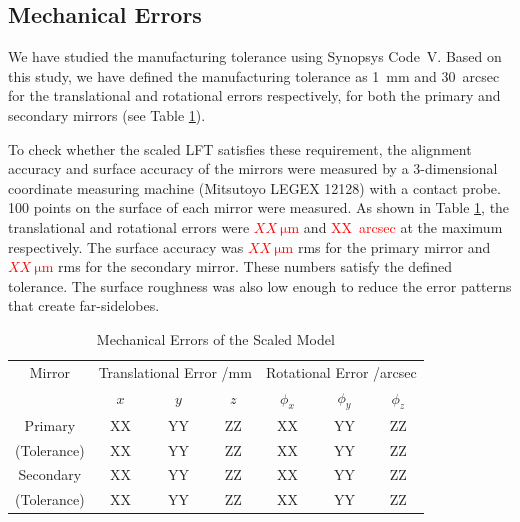 \documentclass[journal]{IEEEtran}
\newcommand{\red}[1]{\textcolor{red}{#1}}
\begin{document}
%
%
\subsection{Mechanical Errors}
%
We have studied the manufacturing tolerance using Synopsys Code~V. 
Based on this study, we have defined the manufacturing tolerance as 1~mm and 30~arcsec for the translational and rotational errors respectively, for both the primary and secondary mirrors (see Table \ref{tb:mech_err}).
\par
To check whether the scaled LFT satisfies these requirement, the alignment accuracy and surface accuracy of the mirrors were measured by a 3-dimensional coordinate measuring machine (Mitsutoyo LEGEX 12128) with a contact probe. 100 points on the surface of each mirror were measured. 
As shown in Table \ref{tb:mech_err}, the translational and rotational errors were \red{$XX~\mathrm{\mu m}$} and \red{XX~arcsec} at the maximum respectively. The surface accuracy was \red{$XX~\mathrm{\mu m}$} rms for the primary mirror and \red{$XX~\mathrm{\mu m}$} rms for the secondary mirror. These numbers satisfy the defined tolerance. The surface roughness was also low enough to reduce the error patterns that create far-sidelobes.

%
\begin{table}[!t]
\renewcommand{\arraystretch}{1.3}
\caption{Mechanical Errors of the Scaled Model}
\label{tb:mech_err}
\centering
\begin{tabular}{|c|ccc|ccc|}
\hline
Mirror & \multicolumn{3}{|c}{Translational Error /mm} & \multicolumn{3}{|c|}{Rotational Error /arcsec} \\
 & $x$ & $y$ & $z$ & $\phi_x$ & $\phi_y$ & $\phi_z$ \\
\hline
Primary & XX & YY & ZZ & XX & YY & ZZ \\
(Tolerance) & XX & YY & ZZ & XX & YY & ZZ \\
\hline
Secondary & XX & YY & ZZ & XX & YY & ZZ \\
(Tolerance) & XX & YY & ZZ & XX & YY & ZZ \\
\hline
\end{tabular}
\end{table}
%
%
\end{document}
